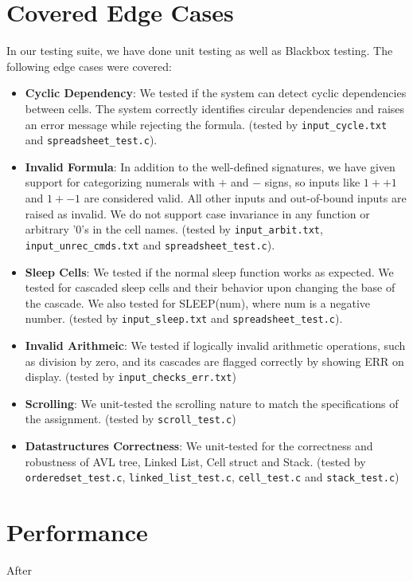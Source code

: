 \documentclass[10pt,a4paper]{article}  %
\begin{document}
\section{Covered Edge Cases}

In our testing suite, we have done unit testing as well as Blackbox testing.
The following edge cases were covered:

\begin{itemize}
    \item \textbf{Cyclic Dependency}: We tested if the system can detect cyclic dependencies between cells. The system correctly identifies circular dependencies and raises an error message while rejecting the formula. (tested by \texttt{input\_cycle.txt} and \texttt{spreadsheet\_test.c}).
    \item \textbf{Invalid Formula}: In addition to the well-defined signatures, we have given support for categorizing numerals with \(+\) and \(-\) signs, so inputs like \(1++1\) and \(1+-1\) are considered valid. All other inputs and out-of-bound inputs are raised as invalid. We do not support case invariance in any function or arbitrary '0's in the cell names. (tested by \texttt{input\_arbit.txt}, \texttt{input\_unrec\_cmds.txt} and \texttt{spreadsheet\_test.c}).
    \item \textbf{Sleep Cells}: We tested if the normal sleep function works as expected. We tested for cascaded sleep cells and their behavior upon changing the base of the cascade. We also tested for SLEEP(num), where num is a negative number. (tested by \texttt{input\_sleep.txt} and \texttt{spreadsheet\_test.c}).
    \item \textbf{Invalid Arithmeic}: We tested if logically invalid arithmetic operations, such as division by zero, and its cascades are flagged correctly by showing ERR on display. (tested by \texttt{input\_checks\_err.txt})
    \item \textbf{Scrolling}: We unit-tested the scrolling nature to match the specifications of the assignment. (tested by \texttt{scroll\_test.c})
    \item \textbf{Datastructures Correctness}: We unit-tested for the correctness and robustness of AVL tree, Linked List, Cell struct and Stack. (tested by \texttt{orderedset\_test.c}, \texttt{linked\_list\_test.c}, \texttt{cell\_test.c} and \texttt{stack\_test.c})
\end{itemize}

\section{Performance}
After 



\end{document}
